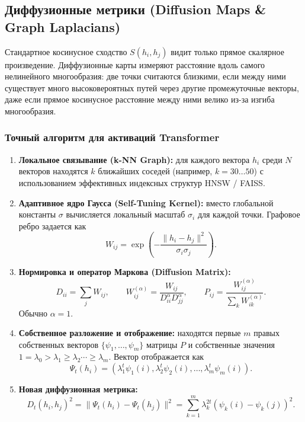 \documentclass[11pt,a4paper]{article}
\begin{document}
\subsection*{Диффузионные метрики (Diffusion Maps \& Graph Laplacians)}

Стандартное косинусное сходство $S(h_i,h_j)$ видит только прямое скалярное произведение. Диффузионные карты измеряют расстояние вдоль самого нелинейного многообразия: две точки считаются близкими, если между ними существует много высоковероятных путей через другие промежуточные векторы, даже если прямое косинусное расстояние между ними велико из-за изгиба многообразия.

\subsubsection*{Точный алгоритм для активаций Transformer}

\begin{enumerate}
    \item \textbf{Локальное связывание (k-NN Graph):} для каждого вектора $h_i$ среди $N$ векторов находятся $k$ ближайших соседей (например, $k=30\ldots50$) с использованием эффективных индексных структур HNSW / FAISS.
    \item \textbf{Адаптивное ядро Гаусса (Self-Tuning Kernel):} вместо глобальной константы $\sigma$ вычисляется локальный масштаб $\sigma_i$ для каждой точки. Графовое ребро задается как
    \[
    W_{ij}=\exp\!\left(-\frac{\|h_i-h_j\|^2}{\sigma_i\sigma_j}\right).
    \]
    \item \textbf{Нормировка и оператор Маркова (Diffusion Matrix):}
    \[
    D_{ii}=\sum_j W_{ij},\qquad
    W_{ij}^{(\alpha)}=\frac{W_{ij}}{D_{ii}^{\alpha}D_{jj}^{\alpha}},
    \qquad
    P_{ij}=\frac{W_{ij}^{(\alpha)}}{\sum_k W_{ik}^{(\alpha)}}.
    \]
    Обычно $\alpha=1$.
    \item \textbf{Собственное разложение и отображение:} находятся первые $m$ правых собственных векторов $\{\psi_1,\dots,\psi_m\}$ матрицы $P$ и собственные значения $1=\lambda_0>\lambda_1\geq\lambda_2\cdots\geq\lambda_m$. Вектор отображается как
    \[
    \Psi_t(h_i)=\left(\lambda_1^t\psi_1(i),\lambda_2^t\psi_2(i),\dots,\lambda_m^t\psi_m(i)\right).
    \]
    \item \textbf{Новая диффузионная метрика:}
    \[
    D_t(h_i,h_j)^2
    =\|\Psi_t(h_i)-\Psi_t(h_j)\|^2
    =\sum_{k=1}^{m}\lambda_k^{2t}\left(\psi_k(i)-\psi_k(j)\right)^2.
    \]
\end{enumerate}
\end{document}
